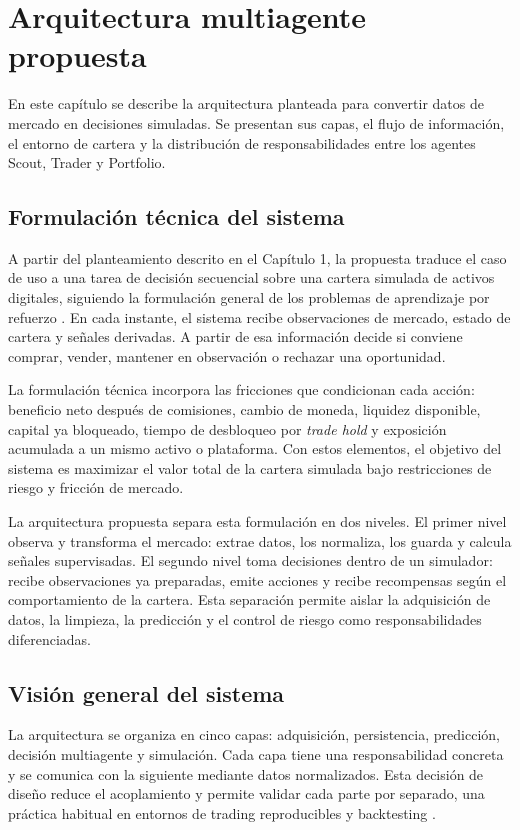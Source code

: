 \chapter{Arquitectura multiagente propuesta}

\noindent En este capítulo se describe la arquitectura planteada para convertir datos de mercado en decisiones simuladas. Se presentan sus capas, el flujo de información, el entorno de cartera y la distribución de responsabilidades entre los agentes Scout, Trader y Portfolio.

\section{Formulación técnica del sistema}

A partir del planteamiento descrito en el Capítulo 1, la propuesta traduce el caso de uso a una tarea de decisión secuencial sobre una cartera simulada de activos digitales, siguiendo la formulación general de los problemas de aprendizaje por refuerzo \cite{sutton2018reinforcement}. En cada instante, el sistema recibe observaciones de mercado, estado de cartera y señales derivadas. A partir de esa información decide si conviene comprar, vender, mantener en observación o rechazar una oportunidad.

La formulación técnica incorpora las fricciones que condicionan cada acción: beneficio neto después de comisiones, cambio de moneda, liquidez disponible, capital ya bloqueado, tiempo de desbloqueo por \textit{trade hold} y exposición acumulada a un mismo activo o plataforma. Con estos elementos, el objetivo del sistema es maximizar el valor total de la cartera simulada bajo restricciones de riesgo y fricción de mercado.

La arquitectura propuesta separa esta formulación en dos niveles. El primer nivel observa y transforma el mercado: extrae datos, los normaliza, los guarda y calcula señales supervisadas. El segundo nivel toma decisiones dentro de un simulador: recibe observaciones ya preparadas, emite acciones y recibe recompensas según el comportamiento de la cartera. Esta separación permite aislar la adquisición de datos, la limpieza, la predicción y el control de riesgo como responsabilidades diferenciadas.

\section{Visión general del sistema}

La arquitectura se organiza en cinco capas: adquisición, persistencia, predicción, decisión multiagente y simulación. Cada capa tiene una responsabilidad concreta y se comunica con la siguiente mediante datos normalizados. Esta decisión de diseño reduce el acoplamiento y permite validar cada parte por separado, una práctica habitual en entornos de trading reproducibles y backtesting \cite{liu2021finrl}.

